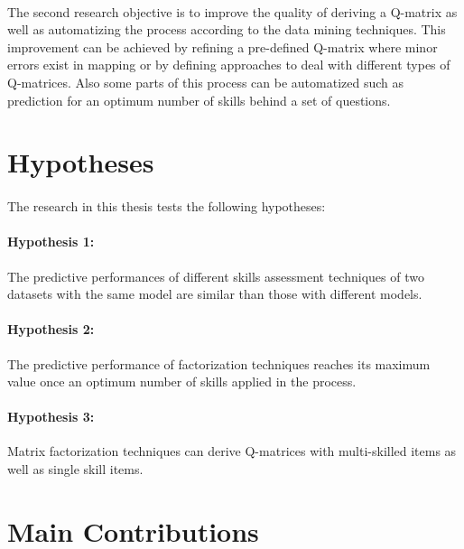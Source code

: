 \paragraph{}The second research objective is to improve the quality of deriving a Q-matrix as well as automatizing the process according to the data mining techniques. This improvement can be achieved by refining a pre-defined Q-matrix where minor errors exist in mapping or by defining approaches to deal with different types of Q-matrices. Also some parts of this process can be automatized such as prediction for an optimum number of skills behind a set of questions.

\section{Hypotheses}
\paragraph{}The research in this thesis tests the following hypotheses:
\paragraph{Hypothesis 1:} The predictive performances of different skills assessment techniques of two datasets with the same model are \DIFdelbegin %
\DIFdelend \DIFaddbegin {}\DIFaddend similar than those with different models. 
\paragraph{Hypothesis 2:} The predictive performance of factorization techniques reaches \DIFaddbegin {}\DIFaddend its maximum value once an optimum number of skills applied in the process.
\DIFdelbegin %
\DIFdelend \paragraph{Hypothesis 3:}Matrix factorization techniques can derive Q-matrices with multi-skilled items as well as single skill items. 
\DIFdelbegin %
\DIFdelend 

\section{Main Contributions}
